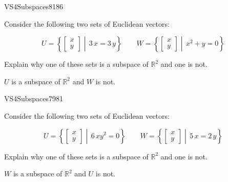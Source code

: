 \begin{exercise}{VS4}{Subspaces}{8186} 
\begin{exerciseStatement} 

Consider the following two sets of Euclidean vectors: 

 \[
          U=\left\{ \left[\begin{array}{c}
x \\
y
\end{array}\right] \middle|\,3 \, x = 3 \, y\right\} \hspace{2em}  W=\left\{ \left[\begin{array}{c}
x \\
y
\end{array}\right] \middle|\,x^{2} + y = 0\right\}
    \] 

 Explain why one of these sets is a subspace of \(\mathbb{R}^2\) and one is not. 

 \end{exerciseStatement}
 \begin{exerciseAnswer} 

\(U\) is a subspace of \(\mathbb{R}^2\) and \(W\) is not.

 \end{exerciseAnswer}
 \end{exercise}


\begin{exercise}{VS4}{Subspaces}{7981} 
\begin{exerciseStatement} 

Consider the following two sets of Euclidean vectors: 

 \[
          U=\left\{ \left[\begin{array}{c}
x \\
y
\end{array}\right] \middle|\,6 \, x y^{2} = 0\right\} \hspace{2em}  W=\left\{ \left[\begin{array}{c}
x \\
y
\end{array}\right] \middle|\,5 \, x = 2 \, y\right\}
    \] 

 Explain why one of these sets is a subspace of \(\mathbb{R}^2\) and one is not. 

 \end{exerciseStatement}
 \begin{exerciseAnswer} 

\(W\) is a subspace of \(\mathbb{R}^2\) and \(U\) is not.

 \end{exerciseAnswer}
 \end{exercise}


